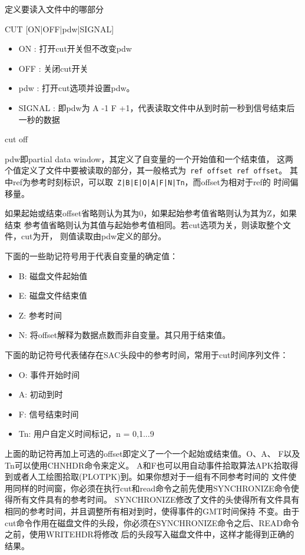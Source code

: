 \label{cmd:cut}

定义要读入文件中的哪部分

\begin{SACSTX}
CUT [ON|OFF|pdw|SIGNAL]
\end{SACSTX}

\begin{itemize}
\item ON : 打开cut开关但不改变pdw 
\item OFF : 关闭cut开关
\item pdw : 打开cut选项并设置pdw。
\item SIGNAL : 即pdw为 A -1 F +1，代表读取文件中从到时前一秒到信号结束后一秒的数据 
\end{itemize}

\begin{SACDFT}
cut off
\end{SACDFT}

pdw即partial data window，其定义了自变量的一个开始值和一个结束值，
这两个值定义了文件中要被读取的部分，其一般格式为~\lstinline{ref offset ref offset}。
其中ref为参考时刻标识，可以取~\lstinline{Z|B|E|O|A|F|N|Tn}，而offset为相对于ref的
时间偏移量。

如果起始或结束offset省略则认为其为0，如果起始参考值省略则认为其为Z，如果结束
参考值省略则认为其值与起始参考值相同。若cut选项为关，则读取整个文件，cut为开，
则值读取由pdw定义的部分。

下面的一些助记符号用于代表自变量的确定值：
\begin{itemize}
\item B: 磁盘文件起始值
\item E: 磁盘文件结束值
\item Z: 参考时间
\item N: 将offset解释为数据点数而非自变量。其只用于结束值。
\end{itemize}

下面的助记符号代表储存在SAC头段中的参考时间，常用于cut时间序列文件：
\begin{itemize}
\item O: 事件开始时间
\item A: 初动到时
\item F: 信号结束时间
\item Tn: 用户自定义时间标记，n = 0,1...9
\end{itemize}

上面的助记符再加上可选的offset即定义了一个一个起始或结束值。O、A、 F以及Tn可以使用CHNHDR命令来定义。
A和F也可以用自动事件拾取算法APK拾取得到或者人工绘图拾取(PLOTPK)到。如果你想对于一组有不同参考时间的
文件使用同样的时间窗，你必须在执行cut和read命令之前先使用SYNCHRONIZE命令使得所有文件具有的参考时间。
SYNCHRONIZE修改了文件的头使得所有文件具有相同的参考时间，并且调整所有相对到时，使得事件的GMT时间保持
不变。由于cut命令作用在磁盘文件的头段，你必须在SYNCHRONIZE命令之后、READ命令之前，使用WRITEHDR将修改
后的头段写入磁盘文件中，这样才能得到正确的结果。

